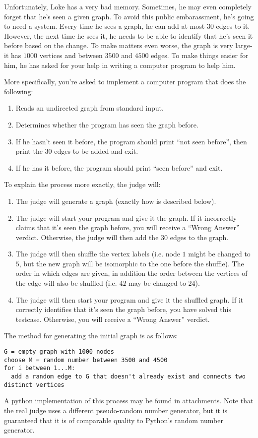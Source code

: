 \noindent
Unfortunately, Loke has a very bad memory. Sometimes, he may even completely forget that he's seen a given graph. 
To avoid this public embarassment, he's going to need a system. Every time he sees a graph, he can add at most $30$
edges to it. However, the next time he sees it, he needs to be able to identify that he's seen it before based on the
change. To make matters even worse, the graph is very large- it has $1000$ vertices and between $3500$ and $4500$ edges.
To make things easier for him, he has asked for your help in writing a computer program to help him.

More specifically, you're asked to implement a computer program that does the following:
\begin{enumerate}
  \item Reads an undirected graph from standard input.
  \item Determines whether the program has seen the graph before.
  \item If he hasn't seen it before, the program should print ``not seen before'', then print the $30$ edges to be added and exit.
  \item If he has it before, the program should print ``seen before'' and exit.
\end{enumerate}
To explain the process more exactly, the judge will:
\begin{enumerate}
  \item The judge will generate a graph (exactly how is described below).
  \item The judge will start your program and give it the graph. If it incorrectly claims that it's seen the graph before,
  you will receive a ``Wrong Answer'' verdict. Otherwise, the judge will then add the $30$ edges to the graph.
  \item The judge will then shuffle the vertex labels (i.e. node $1$ might be changed to $5$, but the new
  graph will be isomorphic to the one before the shuffle). The order in which edges are given, in addition the
  order between the vertices of the edge will also be shuffled (i.e. $4 2$ may be changed to $2 4$).
  \item The judge will then start your program and give it the shuffled graph. If it correctly identifies that
  it's seen the graph before, you have solved this testcase. Otherwise, you will receive a ``Wrong Answer'' verdict.
\end{enumerate}

The method for generating the initial graph is as follows:
\begin{verbatim}
G = empty graph with 1000 nodes
choose M = random number between 3500 and 4500
for i between 1...M:
  add a random edge to G that doesn't already exist and connects two distinct vertices
\end{verbatim}
A python implementation of this process may be found in attachments. Note that the real judge uses a different pseudo-random
number generator, but it is guaranteed that it is of comparable quality to Python's random number generator.


